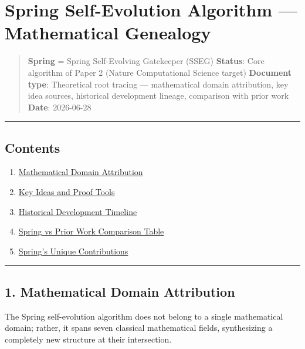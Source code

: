 \documentclass[
  12pt,
]{article}
\author{SCX}
\date{2026}
\providecommand{\tightlist}{%
  \setlength{\itemsep}{0pt}\setlength{\parskip}{0pt}}
\begin{document}
\section{Spring Self-Evolution Algorithm --- Mathematical Genealogy}\label{spring-self-evolution-algorithm-mathematical-genealogy}

\begin{quote}
\textbf{Spring} = Spring Self-Evolving Gatekeeper (SSEG)
\textbf{Status}: Core algorithm of Paper 2 (Nature Computational Science target)
\textbf{Document type}: Theoretical root tracing --- mathematical domain attribution, key idea sources, historical development lineage, comparison with prior work
\textbf{Date}: 2026-06-28
\end{quote}

\begin{center}\rule{0.5\linewidth}{0.5pt}\end{center}

\subsection{Contents}\label{contents}

\begin{enumerate}
\def\labelenumi{\arabic{enumi}.}
\tightlist
\item
  \hyperref[1-mathematical-domain-attribution]{Mathematical Domain Attribution}
\item
  \hyperref[2-key-ideas-and-proof-tools]{Key Ideas and Proof Tools}
\item
  \hyperref[3-historical-development-timeline]{Historical Development Timeline}
\item
  \hyperref[4-spring-vs-prior-work-comparison-table]{Spring vs Prior Work Comparison Table}
\item
  \hyperref[5-springs-unique-contributions]{Spring's Unique Contributions}
\end{enumerate}

\begin{center}\rule{0.5\linewidth}{0.5pt}\end{center}

\subsection{1. Mathematical Domain Attribution}\label{mathematical-domain-attribution}

The Spring self-evolution algorithm does not belong to a single mathematical domain; rather, it spans seven classical mathematical fields, synthesizing a completely new structure at their intersection.
\end{document}
